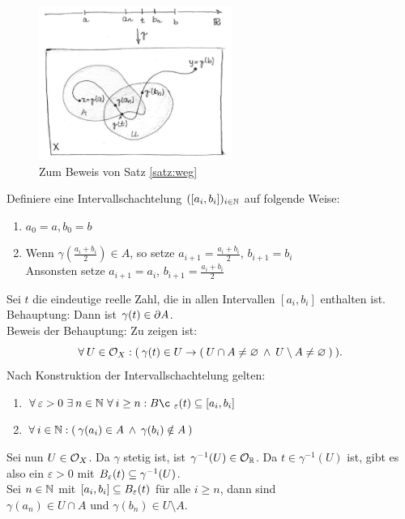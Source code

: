     \begin{figure}[ht]
        \centering
        \includegraphics[height=5cm]{gfx/weg_sw.png}
        \caption{Zum Beweis von Satz \ref{satz:weg}}
        \label{fig:weg}
    \end{figure}

    \begin{bew}
        Definiere eine Intervallschachtelung $([a_i, b_i])_{i \in \mathbb{N}}$ auf folgende Weise:
        \begin{enumerate}
            \item $a_0 = a, b_0 = b$
            \item Wenn $\gamma(\frac{a_i + b_i}{2}) \in A$, so setze $a_{i+1} = \frac{a_i + b_i}{2}$, $b_{i+1} = b_i$\\
            Ansonsten setze $a_{i+1} = a_i$, $b_{i+1} = \frac{a_i + b_i}{2}$
        \end{enumerate}
        Sei $t$ die eindeutige reelle Zahl, die in allen Intervallen $[a_i, b_i]$ enthalten ist.\\
        Behauptung: Dann ist $\gamma(t) \in \partial A$.\\
        Beweis der Behauptung: Zu zeigen ist: 
        \[\forall\: U \in \mathcal{O}_X: (\: \gamma(t) \in U \rightarrow (\: U \cap A \neq \varnothing \:\land\: U \setminus A \neq \varnothing \:) \:).\]
        Nach Konstruktion der Intervallschachtelung gelten:
        \begin{enumerate}
        \item $\forall\: \varepsilon > 0\ \exists\: n \in \N\ \forall\: i \geq n: \ball¸_\varepsilon(t) \subseteq [a_i,b_i]$
        \item $\forall\: i \in \mathbb{N} : (\: \gamma(a_i) \in A \:\land\: \gamma(b_i) \notin A \:)$
        \end{enumerate}
        Sei nun ${U \in \mathcal{O}_X}$. Da $\gamma$ stetig ist, ist ${\gamma^{-1}(U) \in \mathcal{O}_{\mathbb{R}}}$. Da ${t \in \gamma^{-1}(U)}$ ist, gibt es also ein ${\varepsilon > 0}$ mit ${B_\varepsilon(t) \subseteq \gamma^{-1}(U)}$.\\
        Sei ${n \in \mathbb{N}}$ mit ${[a_i, b_i] \subseteq B_\varepsilon(t)}$ für alle ${i \geq n}$, dann sind \\
        ${\gamma(a_n) \in U \cap A}$ und ${\gamma(b_n) \in U \setminus A}$.
    \end{bew}
